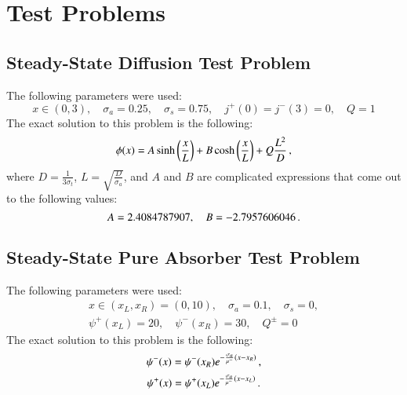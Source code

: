 \section{Test Problems}
\subsection{Steady-State Diffusion Test Problem}
The following parameters were used:
\[
   x\in(0,3),
   \quad \sigma_a = 0.25,
   \quad \sigma_s = 0.75,
   \quad j^+(0) = j^-(3) = 0,
   \quad Q = 1
\]
The exact solution to this problem is the following:
\[
   \phi(x) = A\sinh\left( \frac{x}{L} \right) + B\cosh\left( \frac{x}{L} \right) + Q\frac{L^2}{D} \, ,
\]
where $D=\frac{1}{3\sigma_t}$, $L=\sqrt{\frac{D}{\sigma_a}}$, and $A$ and $B$ are
complicated expressions that come out to the following values:
\[
   A=2.4084787907,\quad B=-2.7957606046 \, .
\]

\subsection{Steady-State Pure Absorber Test Problem}
The following parameters were used:
\begin{gather*}
   x\in(x_L,x_R)=(0,10),
   \quad \sigma_a = 0.1,
   \quad \sigma_s = 0,\\
   \psi^+(x_L) = 20,
   \quad \psi^-(x_R) = 30,
   \quad Q^\pm = 0
\end{gather*}
The exact solution to this problem is the following:
\[
   \psi^-(x) = \psi^-(x_R)e^{-\frac{\sigma_a}{\mu^-}\left( x-x_R \right)} \, ,
\]
\[
   \psi^+(x) = \psi^+(x_L)e^{-\frac{\sigma_a}{\mu^-}\left( x-x_L \right)} \, .
\]


